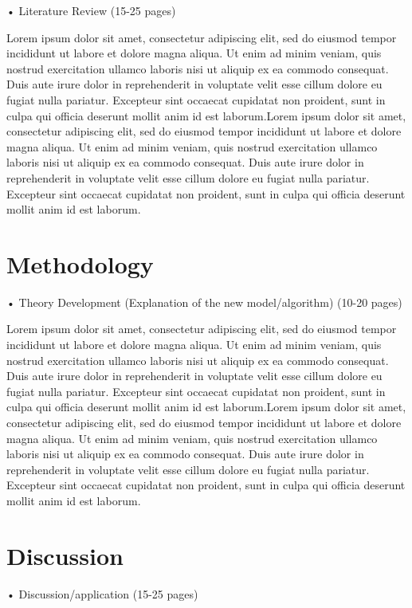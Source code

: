 \documentclass[12pt,a4 paper,openany,oneside, title page]{book}
\begin{document}
• Literature Review (15-25 pages)

Lorem ipsum dolor sit amet, consectetur adipiscing elit, sed do eiusmod tempor incididunt ut labore et dolore magna aliqua. Ut enim ad minim veniam, quis nostrud exercitation ullamco laboris nisi ut aliquip ex ea commodo consequat. Duis aute irure dolor in reprehenderit in voluptate velit esse cillum dolore eu fugiat nulla pariatur. Excepteur sint occaecat cupidatat non proident, sunt in culpa qui officia deserunt mollit anim id est laborum.Lorem ipsum dolor sit amet, consectetur adipiscing elit, sed do eiusmod tempor incididunt ut labore et dolore magna aliqua. Ut enim ad minim veniam, quis nostrud exercitation ullamco laboris nisi ut aliquip ex ea commodo consequat. Duis aute irure dolor in reprehenderit in voluptate velit esse cillum dolore eu fugiat nulla pariatur. Excepteur sint occaecat cupidatat non proident, sunt in culpa qui officia deserunt mollit anim id est laborum.

\chapter{Methodology}
• Theory Development (Explanation of the new model/algorithm) (10-20 pages)


Lorem ipsum dolor sit amet, consectetur adipiscing elit, sed do eiusmod tempor incididunt ut labore et dolore magna aliqua. Ut enim ad minim veniam, quis nostrud exercitation ullamco laboris nisi ut aliquip ex ea commodo consequat. Duis aute irure dolor in reprehenderit in voluptate velit esse cillum dolore eu fugiat nulla pariatur. Excepteur sint occaecat cupidatat non proident, sunt in culpa qui officia deserunt mollit anim id est laborum.Lorem ipsum dolor sit amet, consectetur adipiscing elit, sed do eiusmod tempor incididunt ut labore et dolore magna aliqua. Ut enim ad minim veniam, quis nostrud exercitation ullamco laboris nisi ut aliquip ex ea commodo consequat. Duis aute irure dolor in reprehenderit in voluptate velit esse cillum dolore eu fugiat nulla pariatur. Excepteur sint occaecat cupidatat non proident, sunt in culpa qui officia deserunt mollit anim id est laborum.


\chapter{Discussion}
• Discussion/application (15-25 pages)
\end{document}
